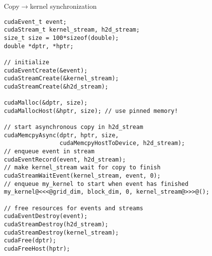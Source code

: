\begin{frame}[fragile]{}
    \begin{code}{Copy$\rightarrow$kernel synchronization}
        \begin{lstlisting}[style=boxcudatiny]
cudaEvent_t event;
cudaStream_t kernel_stream, h2d_stream;
size_t size = 100*sizeof(double);
double *dptr, *hptr;

// initialize
cudaEventCreate(&event);
cudaStreamCreate(&kernel_stream);
cudaStreamCreate(&h2d_stream);

cudaMalloc(&dptr, size);
cudaMallocHost(&hptr, size); // use pinned memory!

// start asynchronous copy in h2d_stream
cudaMemcpyAsync(dptr, hptr, size,
                cudaMemcpyHostToDevice, h2d_stream);
// enqueue event in stream
cudaEventRecord(event, h2d_stream);
// make kernel_stream wait for copy to finish
cudaStreamWaitEvent(kernel_stream, event, 0);
// enqueue my_kernel to start when event has finished
my_kernel@<<<@grid_dim, block_dim, 0, kernel_stream@>>>@();

// free resources for events and streams
cudaEventDestroy(event);
cudaStreamDestroy(h2d_stream);
cudaStreamDestroy(kernel_stream);
cudaFree(dptr);
cudaFreeHost(hptr);
        \end{lstlisting}
    \end{code}
\end{frame}

